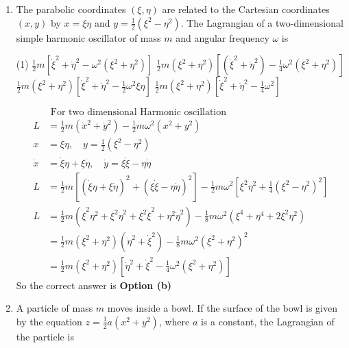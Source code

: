 \begin{enumerate}
	\item The parabolic coordinates $(\xi, \eta)$ are related to the Cartesian coordinates $(x, y)$ by $x=\xi \eta$ and $y=\frac{1}{2}\left(\xi^{2}-\eta^{2}\right)$. The Lagrangian of a two-dimensional simple harmonic oscillator of mass $m$ and angular frequency $\omega$ is
{}
	 \begin{tasks}(1)
		\task[\textbf{a.}]$\frac{1}{2} m\left[\dot{\xi}^{2}+\dot{\eta}^{2}-\omega^{2}\left(\xi^{2}+\eta^{2}\right)\right]$
		\task[\textbf{b.}]$\frac{1}{2} m\left(\xi^{2}+\eta^{2}\right)\left[\left(\dot{\xi}^{2}+\dot{\eta}^{2}\right)-\frac{1}{4} \omega^{2}\left(\xi^{2}+\eta^{2}\right)\right]$
		\task[\textbf{c.}] $\frac{1}{2} m\left(\xi^{2}+\eta^{2}\right)\left[\dot{\xi}^{2}+\dot{\eta}^{2}-\frac{1}{2} \omega^{2} \xi \eta\right]$
		\task[\textbf{d.}] $\frac{1}{2} m\left(\xi^{2}+\eta^{2}\right)\left[\dot{\xi}^{2}+\dot{\eta}^{2}-\frac{1}{4} \omega^{2}\right]$
	\end{tasks}
\begin{answer}
	$$
	\begin{aligned}
	&\text { For two dimensional Harmonic oscillation }\\
	L&=\frac{1}{2} m\left(\dot{x}^{2}+\dot{y}^{2}\right)-\frac{1}{2} m \omega^{2}\left(x^{2}+y^{2}\right) \\
	x&=\xi \eta, \quad y=\frac{1}{2}\left(\xi^{2}-\eta^{2}\right) \\
	\dot{x}&=\dot{\xi} \eta+\xi \dot{\eta}, \quad \dot{y}=\xi \dot{\xi}-\eta \dot{\eta}\\
	L&=\frac{1}{2} m\left[(\dot{\xi} \eta+\xi \dot{\eta})^{2}+(\xi \dot{\xi}-\eta \dot{\eta})^{2}\right]-\frac{1}{2} m \omega^{2}\left[\xi^{2} \eta^{2}+\frac{1}{4}\left(\xi^{2}-\eta^{2}\right)^{2}\right] \\
	L&=\frac{1}{2} m\left(\dot{\xi}^{2} \eta^{2}+\xi^{2} \dot{\eta}^{2}+\xi^{2} \dot{\xi}^{2}+\eta^{2} \dot{\eta}^{2}\right)-\frac{1}{8} m \omega^{2}\left(\xi^{4}+\eta^{4}+2 \xi^{2} \eta^{2}\right) \\
	&=\frac{1}{2} m\left(\xi^{2}+\eta^{2}\right)\left(\dot{\eta}^{2}+\dot{\xi}^{2}\right)-\frac{1}{8} m \omega^{2}\left(\xi^{2}+\eta^{2}\right)^{2} \\
	&=\frac{1}{2} m\left(\xi^{2}+\eta^{2}\right)\left[\dot{\eta}^{2}+\dot{\xi}^{2}-\frac{1}{4} \omega^{2}\left(\xi^{2}+\eta^{2}\right)\right]
\end{aligned}
$$
So the correct answer is \textbf{Option (b)}
\end{answer}
	\item A particle of mass $m$ moves inside a bowl. If the surface of the bowl is given by the equation $z=\frac{1}{2} a\left(x^{2}+y^{2}\right)$, where $a$ is a constant, the Lagrangian of the particle is

\end{enumerate}
